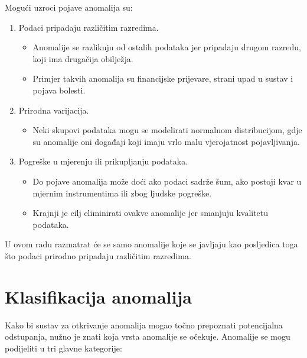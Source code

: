 \documentclass[utf8, diplomski, numeric]{fer}
\begin{document}
Mogući uzroci pojave anomalija su:
\begin{enumerate}
\item Podaci pripadaju različitim razredima.
\begin{itemize}
\item Anomalije se razlikuju od ostalih podataka jer pripadaju drugom razredu, koji ima drugačija obilježja.
\item Primjer takvih anomalija su financijske prijevare, strani upad u sustav i pojava bolesti.
\end{itemize}

\item Prirodna varijacija.
\begin{itemize}
\item Neki skupovi podataka mogu se modelirati normalnom distribucijom, gdje su anomalije oni događaji koji imaju vrlo malu vjerojatnost pojavljivanja.
\end{itemize}

\item Pogreške u mjerenju ili prikupljanju podataka.
\begin{itemize}
\item Do pojave anomalija može doći ako podaci sadrže šum, ako postoji kvar u mjernim instrumentima ili zbog ljudske pogreške.
\item Krajnji je cilj eliminirati ovakve anomalije jer smanjuju kvalitetu podataka.
\end{itemize}

\end{enumerate}

U ovom radu razmatrat će se samo anomalije koje se javljaju kao posljedica toga što podaci prirodno pripadaju različitim razredima.

\section{Klasifikacija anomalija}
Kako bi sustav za otkrivanje anomalija mogao točno prepoznati potencijalna odstupanja, nužno je znati koja vrsta anomalije se očekuje. Anomalije se mogu podijeliti u tri glavne kategorije:
\end{document}
